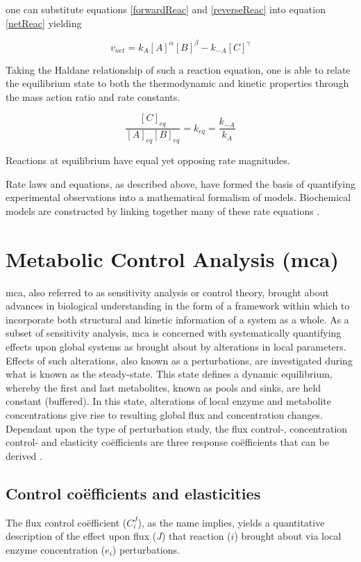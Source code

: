 one can substitute equations \ref{forwardReac} and \ref{reverseReac} into equation \ref{netReac} yielding

\begin{equation}
v_{net} = k_A[A]^\alpha[B]^\beta - k_{-A}[C]^\gamma
\end{equation}

Taking the Haldane relationship of such a reaction equation, one is able to relate the equilibrium state to both the thermodynamic and kinetic properties through the mass action ratio and rate constants.

\begin{equation}
\frac{[C]_{eq}}{[A]_{eq}[B]_{eq}} = k_{eq} = \frac{k_{-A}}{k_A}
\end{equation}

Reactions at equilibrium have equal yet opposing rate magnitudes. 

Rate laws and equations, as described above, have formed the basis of quantifying experimental observations into a mathematical formalism of models. Biochemical models are constructed by linking together many of these rate equations \cite{Copeland2000, Hynne2001, Kell2006}. 

\section{Metabolic Control Analysis (\gls{mca})}
\gls{mca}, also referred to as sensitivity analysis or control theory, brought about advances in biological understanding in the form of a framework within which to incorporate both structural and kinetic information of a system as a whole. As a subset of sensitivity analysis, \gls{mca} is concerned with systematically quantifying effects upon global systems as brought about by alterations in local parameters. Effects of such alterations, also known as a perturbations, are investigated during what is known as the \gls{steady-state}. This state defines a dynamic equilibrium, whereby the first and last metabolites, known as pools and sinks, are held constant (buffered). In this state, alterations of local enzyme and metabolite concentrations give rise to resulting global flux and concentration changes. Dependant upon the type of perturbation study, the flux control-, concentration control- and elasticity co\"efficients are three response co\"efficients that can be derived \citep{Kacser1979, Kacser1968}. 

\subsection{Control co\"efficients and elasticities} 
The flux control co\"efficient ($C^{J}_{i}$), as the name implies, yields a quantitative description of the effect upon flux ($J$) that reaction ($i$) brought about via local enzyme concentration ($e_i$) perturbations.

